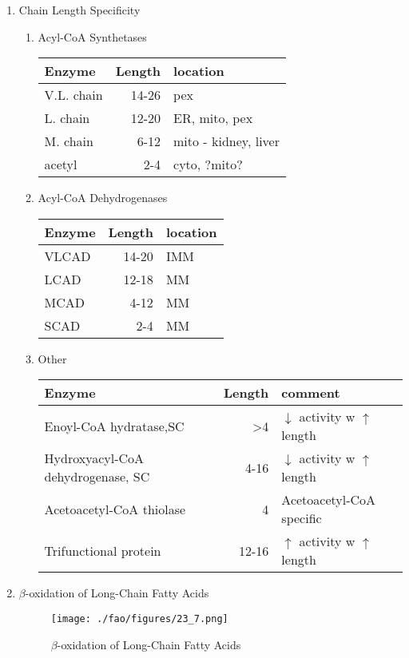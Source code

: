 \documentclass{scrartcl}
\begin{document}
\begin{enumerate}
\item Chain Length Specificity
\label{sec:orga01dfe5}

\begin{enumerate}
\item Acyl-CoA Synthetases
\label{sec:orgdb4ebaa}

\begin{center}
\begin{tabular}{lrl}
Enzyme & Length & location\\
\hline
V.L. chain & 14-26 & pex\\
L. chain & 12-20 & ER, mito, pex\\
M. chain & 6-12 & mito - kidney, liver\\
acetyl & 2-4 & cyto, ?mito?\\
\end{tabular}
\end{center}


\item Acyl-CoA Dehydrogenases
\label{sec:org92c6f9d}
\begin{center}
\begin{tabular}{lrl}
Enzyme & Length & location\\
\hline
VLCAD & 14-20 & IMM\\
LCAD & 12-18 & MM\\
MCAD & 4-12 & MM\\
SCAD & 2-4 & MM\\
\end{tabular}
\end{center}


\item Other
\label{sec:org7302631}
\begin{center}
\begin{tabular}{lrl}
Enzyme & Length & comment\\
\hline
Enoyl-CoA hydratase,SC & >4 & \(\downarrow\) activity w \(\uparrow\) length\\
Hydroxyacyl-CoA dehydrogenase, SC & 4-16 & \(\downarrow\) activity w \(\uparrow\) length\\
Acetoacetyl-CoA thiolase & 4 & Acetoacetyl-CoA specific\\
Trifunctional protein & 12-16 & \(\uparrow\) activity w \(\uparrow\) length\\
\end{tabular}
\end{center}
\end{enumerate}


\item \(\beta\)-oxidation of Long-Chain Fatty Acids
\label{sec:orgf1ca713}
\begin{figure}[htbp]
\centering
\texttt{[image: ./fao/figures/23\_7.png]}
\caption{\label{fig:org764e8bd}
\(\beta\)-oxidation of Long-Chain Fatty Acids}
\end{figure}


\end{enumerate}
\end{document}
